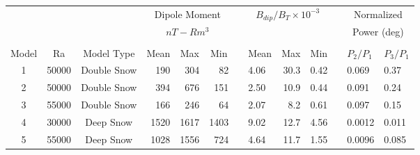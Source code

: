 \begin{tabular}{cccrrrllrrlll}
\multicolumn{3}{l}{}                                               & \multicolumn{3}{c}{Dipole Moment}                                            &  & \multicolumn{3}{c}{$B_{dip}/B_{T}\times10^{-3}$}                             &  & \multicolumn{2}{c}{Normalized}                               \\
\multicolumn{1}{l}{} & \multicolumn{1}{l}{} & \multicolumn{1}{l}{} & \multicolumn{3}{c}{$nT-Rm^3$}                                                &  & \multicolumn{3}{l}{}                                                         &  & \multicolumn{2}{c}{Power (deg)}                              \\  \cline{4-6} \cline{8-10} \cline{12-13} \\[-1.5ex]
Model                & Ra                   & Model Type           & \multicolumn{1}{c}{Mean} & \multicolumn{1}{c}{Max} & \multicolumn{1}{c}{Min} &  & \multicolumn{1}{c}{Mean} & \multicolumn{1}{c}{Max} & \multicolumn{1}{c}{Min} &  & $P_2/P_1$   & \multicolumn{1}{c}{$P_3/P_1$} \\ [.8ex]\hline
1                    & 50000                & Double Snow          & 190                      & 304                     & 82                      &  & 4.06                     & 30.3                    & 0.42                    &  & 0.069       & 0.37                                           \\
2                    & 50000                & Double Snow          & 394                      & 676                     & 151                     &  & 2.50                     & 10.9                    & 0.44                    &  & 0.091       & 0.24                                           \\
3                    & 55000                & Double Snow          & 166                      & 246                     & 64                      &  & 2.07                     & 8.2                     & 0.61                    &  & 0.097       & 0.15                                           \\
4                    & 30000                & Deep Snow            & 1520                     & 1617                    & 1403                    &  & 9.02                     & 12.7                    & 4.56                    &  & 0.0012      & 0.011                                           \\
5                    & 55000                & Deep Snow            & 1028                     & 1556                    & 724                     &  & 4.64                     & 11.7                    & 1.55                    &  & 0.0096      & 0.085                   
\end{tabular}
